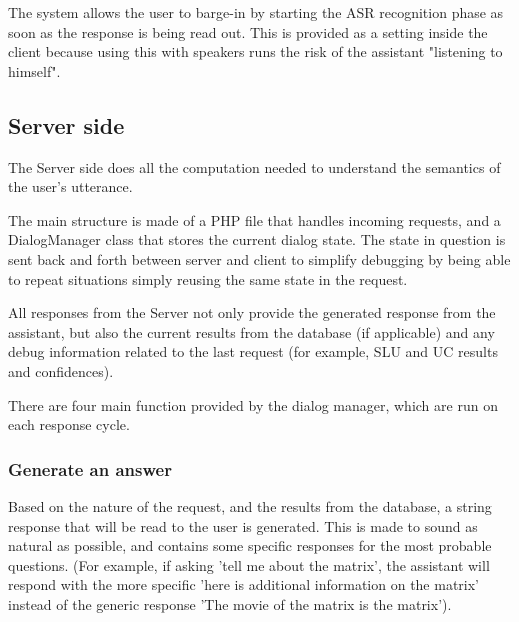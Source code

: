 \documentclass[11pt,a4paper]{article}
\begin{document}
The system allows the user to barge-in by starting the ASR recognition phase as soon as the response is being read out. This is provided as a setting inside the client because using this with speakers runs the risk of the assistant "listening to himself".

\subsection{Server side}
The Server side does all the computation needed to understand the semantics of the user's utterance.

The main structure is made of a PHP file that handles incoming requests, and a DialogManager class that stores the current dialog state. The state in question is sent back and forth between server and client to simplify debugging by being able to repeat situations simply reusing the same state in the request.

All responses from the Server not only provide the generated response from the assistant, but also the current results from the database (if applicable) and any debug information related to the last request (for example, SLU and UC results and confidences).

There are four main function provided by the dialog manager, which are run on each response cycle.

\subsubsection{Generate an answer}
Based on the nature of the request, and the results from the database, a string response that will be read to the user is generated. This is made to sound as natural as possible, and contains some specific responses for the most probable questions. (For example, if asking 'tell me about the matrix', the assistant will respond with the more specific 'here is additional information on the matrix' instead of the generic response 'The movie of the matrix is the matrix').
\end{document}
